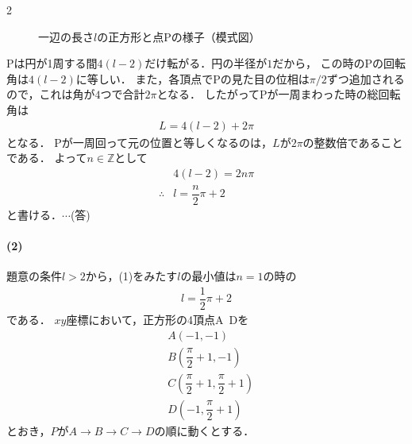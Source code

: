 \documentclass[../../main.tex]{subfiles}
\begin{document}
\begin{multicols}{2}
\begin{figure}[H]
    \caption{一辺の長さ$l$の正方形と点Pの様子（模式図）}
    \label{1994-2:fig:1}
  \end{figure}

  Pは円が1周する間$4(l-2)$だけ転がる．円の半径が$1$だから，
  この時のPの回転角は$4(l-2)$に等しい．
  また，各頂点でPの見た目の位相は$\pi/2$ずつ追加されるので，これは角が$4$つで合計$2\pi$となる．
  したがってPが一周まわった時の総回転角は
  \begin{align}
    L = 4(l-2) + 2\pi
  \end{align}
  となる．
  Pが一周回って元の位置と等しくなるのは，$L$が$2\pi$の整数倍であることである．
  よって$n \in \mathbb{Z}$として
  \begin{align}
    & 4(l-2) = 2n\pi         \\
    \therefore
    & l = \dfrac{n}{2}\pi + 2
  \end{align}
  と書ける．$\cdots$(答)

  \paragraph{(2)}
  題意の条件$l>2$から，(1)をみたす$l$の最小値は$n=1$の時の
  \begin{align}
    l=\dfrac{1}{2}\pi+2
  \end{align}
  である．
  $xy$座標において，正方形の4頂点A~Dを
  \begin{align}
    & A(-1, -1)                           \\
    & B(\dfrac{\pi}{2}+1, -1)              \\
    & C(\dfrac{\pi}{2}+1, \dfrac{\pi}{2}+1) \\
    & D(-1, \dfrac{\pi}{2}+1)
  \end{align}
  とおき，$P$が$A \to B \to C \to D$の順に動くとする．


\end{multicols}
\end{document}
